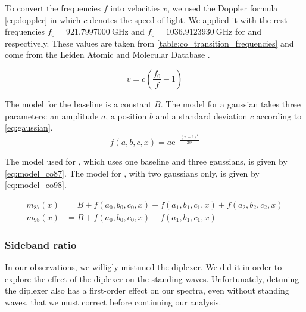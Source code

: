 To convert the frequencies $f$ into velocities $v$, we used the Doppler formula \eqref{eq:doppler} in which $c$ denotes the speed of light.
We applied it with the rest frequencies
$f_0 = \SI{ 921.7997000}{\giga\hertz}$ and
$f_0 = \SI{1036.9123930}{\giga\hertz}$
for  and  respectively.
These values are taken from \cref{table:co_transition_frequencies} and come from the Leiden Atomic and Molecular Database \cite{schoier2004leidenmoldb}.

\begin{equation}
    v = c \left( \frac{f_0}{f} - 1 \right) \label{eq:doppler}
\end{equation}

The model for the baseline is a constant $B$.
The model for a gaussian takes three parameters:
an amplitude $a$,
a position $b$ and
a standard deviation $c$
according to \cref{eq:gaussian}.
\begin{equation}
    f(a, b, c, x) = a \mathrm{e}^{- \frac{(x - b)^2}{2 c^2}} \label{eq:gaussian}
\end{equation}

The model used for , which uses one baseline and three gaussians, is given by \cref{eq:model_co87}.
The model for , with two gaussians only, is given by \cref{eq:model_co98}.

\begin{align}
    m_{87}(x) &= B + f(a_0, b_0, c_0, x) + f(a_1, b_1, c_1, x) + f(a_2, b_2, c_2, x)
    \label{eq:model_co87}
    \\
    m_{98}(x) &= B + f(a_0, b_0, c_0, x) + f(a_1, b_1, c_1, x)
    \label{eq:model_co98}
\end{align}


\subsubsection{Sideband ratio}
In our observations, we willigly mistuned the diplexer.
We did it in order to explore the effect of the diplexer on the standing waves.
Unfortunately, detuning the diplexer also has a first-order effect on our spectra, even without standing waves, that we must correct before continuing our analysis.




